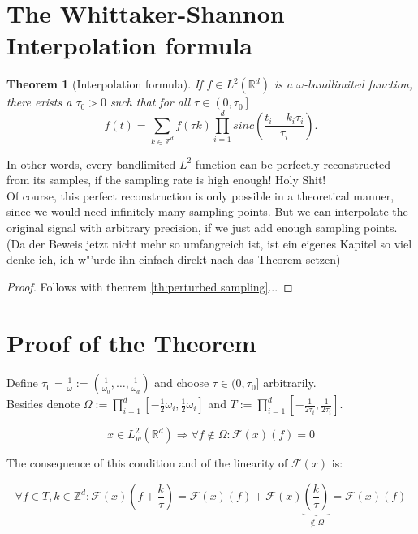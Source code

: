 \documentclass[a4paper, 11pt]{scrreprt}
\newtheorem{theorem}[defi]{Theorem}
\newcommand{\RR}{\mathbb{R}}
\newcommand{\ZZ}{\mathbb{Z}}
\newcommand{\FF}{\mathcal{F}}
\begin{document}
\section{The Whittaker-Shannon Interpolation formula}

\begin{theorem}[Interpolation formula]
\label{th:interpolation}
If \(f \in L^2(\RR^d)\) is a \(\omega\)-bandlimited function, there exists a \(\tau_0 > 0\) such that for all \(\tau \in \left(0,\tau_0\right]\)
\begin{equation}
	f(t) = \sum_{k \in \ZZ^d} f(\tau k) \prod_{i=1}^d sinc\left(\frac{t_i-k_i \tau_i}{\tau_i}\right).
\end{equation}
\end{theorem}
In other words, every bandlimited \(L^2\) function can be perfectly reconstructed from its samples, if the sampling rate is high enough! Holy Shit!\\
Of course, this perfect reconstruction is only possible in a theoretical manner, since we would need infinitely many sampling points. But we can interpolate the original signal with arbitrary precision, if we just add enough sampling points.\\
(Da der Beweis jetzt nicht mehr so umfangreich ist, ist ein eigenes Kapitel so viel denke ich, ich w"'urde ihn einfach direkt nach das Theorem setzen)\\
\begin{proof}[Proof]
Follows with theorem \ref{th:perturbed sampling}...
\end{proof}

\section{Proof of the Theorem}
Define \(\tau_0 = \frac{1}{\omega} := \left(\frac{1}{\omega_0}, \ldots, \frac{1}{\omega_d}\right)\) and choose \(\tau \in (0,\tau_0]\) arbitrarily. \\
Besides denote \(\Omega := \prod_{i=1}^d \left[-\frac{1}{2}\omega_i ,\frac{1}{2}\omega_i\right]\) and \(T := \prod_{i=1}^d \left[-\frac{1}{2\tau_i} ,\frac{1}{2\tau_i}\right]\).

\begin{equation}
x \in L^2_w(\RR^d) \Rightarrow \forall f\notin \Omega: \FF(x)(f) = 0
\end{equation}

The consequence of this condition and of the linearity of \(\FF(x)\) is:

\[\forall f\in T, k \in \ZZ^d: \FF(x)\left(f+\frac{k}{\tau}\right) = \FF(x)(f) + \FF(x)\underbrace{\left(\frac{k}{\tau}\right)}_{\notin \Omega} = \FF(x)(f)\]
\end{document}
